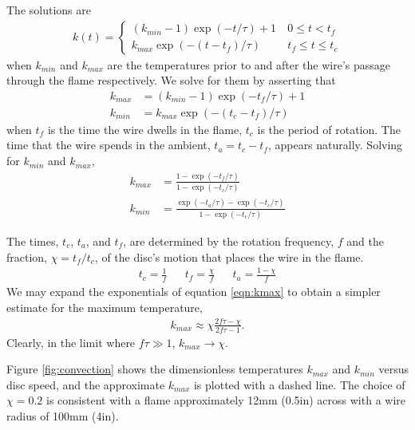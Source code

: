 The solutions are
\begin{align}
k(t) = \left\{\begin{array}{lr}
(k_{min} - 1) \exp(-t/\tau) + 1 & \ 0 \le t < t_f\\
k_{max} \exp(-(t-t_f)/\tau) & \ t_f \le t \le t_c
\end{array}\right.
\end{align}
when $k_{min}$ and $k_{max}$ are the temperatures prior to and after the wire's passage through the flame respectively.  We solve for them by asserting that
\begin{align}
k_{max} &= (k_{min} - 1) \exp(-t_f/\tau) + 1\nonumber\\
k_{min} &= k_{max} \exp(-(t_c-t_f)/\tau)\nonumber
\end{align}
when $t_f$ is the time the wire dwells in the flame, $t_c$ is the period of rotation.  The time that the wire spends in the ambient, $t_a = t_c-t_f$, appears naturally.  Solving for $k_{min}$ and $k_{max}$, 
\begin{subequations}\label{eqn:k}
\begin{align}
k_{max} &= \frac{1-\exp(-t_f/\tau)}{1-\exp(-t_c/\tau)}\label{eqn:kmax}\\
k_{min} &= \frac{\exp(-t_a/\tau)-\exp(-t_c/\tau)}{1-\exp(-t_c/\tau)}\label{eqn:kmin}
\end{align}
\end{subequations}

The times, $t_c$, $t_a$, and $t_f$, are determined by the rotation frequency, $f$ and the fraction, $\chi = t_f / t_c$, of the disc's motion that places the wire in the flame.
\begin{align}
t_c = \frac{1}{f} & & t_f = \frac{\chi}{f} & & t_a = \frac{1-\chi}{f}\nonumber
\end{align}
We may expand the exponentials of equation \ref{eqn:kmax} to obtain a simpler estimate for the maximum temperature,
\begin{align}
k_{max} \approx \chi \frac{2f\tau - \chi}{2f\tau - 1}\label{eqn:kmax:lim}.
\end{align}
Clearly, in the limit where $f\tau \gg 1$, $k_{max} \rightarrow \chi$.

Figure \ref{fig:convection} shows the dimensionless temperatures $k_{max}$ and $k_{min}$ versus disc speed, and the approximate $k_{max}$ is plotted with a dashed line.  The choice of $\chi=0.2$ is consistent with a flame approximately 12mm (0.5in) across with a wire radius of 100mm (4in).

